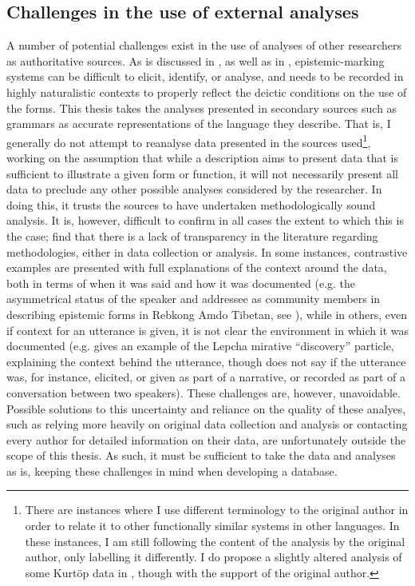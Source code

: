 \subsection{Challenges in the use of external analyses}\label{ss:Methods:Challenges}
A number of potential challenges exist in the use of analyses of other researchers as authoritative sources. As is discussed in , as well as in , epistemic-marking systems can be difficult to elicit, identify, or analyse, and needs to be recorded in highly naturalistic contexts to properly reflect the deictic conditions on the use of the forms. This thesis takes the analyses presented in secondary sources such as grammars as accurate representations of the language they describe. That is, I generally do not attempt to reanalyse data presented in the sources used\footnote{There are instances where I use different terminology to the original author in order to relate it to other functionally similar systems in other languages. In these instances, I am still following the content of the analysis by the original author, only labelling it differently. I do propose a slightly altered analysis of some Kurtöp data in , though with the support of the original author.}, working on the assumption that while a description aims to present data that is sufficient to illustrate a given form or function, it will not necessarily present all data to preclude any other possible analyses considered by the researcher. In doing this, it trusts the sources to have undertaken methodologically sound analysis. It is, however, difficult to confirm in all cases the extent to which this is the case;  find that there is a lack of transparency in the literature regarding methodologies, either in data collection or analysis. In some instances, contrastive examples are presented with full explanations of the context around the data, both in terms of when it was said and how it was documented (e.g. the asymmetrical status of the speaker and addressee as community members in \cite[300]{Simon2021} describing epistemic forms in Rebkong Amdo Tibetan, see ), while in others, even if context for an utterance is given, it is not clear the environment in which it was documented (e.g.  gives an example of the Lepcha mirative ``discovery'' particle, explaining the context behind the utterance, though does not say if the utterance was, for instance, elicited, or given as part of a narrative, or recorded as part of a conversation between two speakers). These challenges are, however, unavoidable. Possible solutions to this uncertainty and reliance on the quality of these analyes, such as relying more heavily on original data collection and analysis or contacting every author for detailed information on their data, are unfortunately outside the scope of this thesis. As such, it must be sufficient to take the data and analyses as is, keeping these challenges in mind when developing a database.

